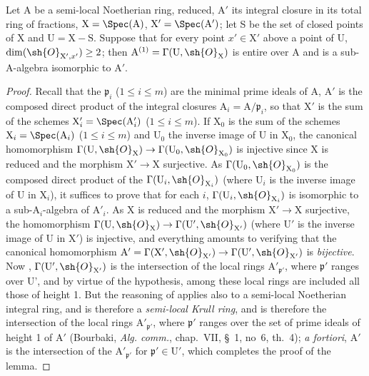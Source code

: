 \begin{lemma}[18.9.7.5]
\label{IV.18.9.7.5}
Let $\mathrm{A}$ be a semi-local Noetherian ring, reduced, $\mathrm{A}'$ its integral closure in its total ring of fractions, $\mathrm{X}=\Spec(\mathrm{A})$, $\mathrm{X}'=\Spec(\mathrm{A}')$;
let S be the set of closed points of $\mathrm{X}$ and $\mathrm{U}=\mathrm{X}-\mathrm{S}$.
Suppose that for every point $x'\in\mathrm{X}'$ above a point of $\mathrm{U}$, $\dim(\sh{O}_{\mathrm{X}',x'})\geq 2$;
then $\mathrm{A}^{(1)}=\Gamma(\mathrm{U},\sh{O}_{\mathrm{X}})$ is entire over $\mathrm{A}$ and is a sub-A-algebra isomorphic to $\mathrm{A}'$.
\end{lemma}

\begin{proof}
Recall that the $\mathfrak{p}_i$ ($1\leq i\leq m$) are the minimal prime ideals of A, $\mathrm{A}'$ is the composed direct product of the integral closures $\mathrm{A}_i=\mathrm{A}/\mathfrak{p}_i$, so that $\mathrm{X}'$ is the sum of the schemes $\mathrm{X}'_i=\Spec(\mathrm{A}'_i)$ ($1\leq i\leq m$).
If $\mathrm{X}_0$ is the sum of the schemes $\mathrm{X}_i=\Spec(\mathrm{A}_i)$ ($1\leq i\leq m$) and $\mathrm{U}_0$ the inverse image of U in $\mathrm{X}_0$, the canonical homomorphism $\Gamma(\mathrm{U},\sh{O}_{\mathrm{X}})\to\Gamma(\mathrm{U}_0,\sh{O}_{\mathrm{X}_0})$ is injective since X is reduced and the morphism $\mathrm{X}'\to\mathrm{X}$ surjective.
As $\Gamma(\mathrm{U}_0,\sh{O}_{\mathrm{X}_0})$ is the composed direct product of the $\Gamma(\mathrm{U}_i,\sh{O}_{\mathrm{X}_i})$ (where $\mathrm{U}_i$ is the inverse image of U in $\mathrm{X}_i$), it suffices to prove that for each $i$, $\Gamma(\mathrm{U}_i,\sh{O}_{\mathrm{X}_i})$ is isomorphic to a sub-$\mathrm{A}_i$-algebra of $\mathrm{A}'_i$.
As X is reduced and the morphism $\mathrm{X}'\to\mathrm{X}$ surjective, the homomorphism $\Gamma(\mathrm{U},\sh{O}_{\mathrm{X}})\to\Gamma(\mathrm{U}',\sh{O}_{\mathrm{X}'})$ (where $\mathrm{U}'$ is the inverse image of U in $\mathrm{X}'$) is injective, and everything amounts to verifying that the canonical homomorphism $\mathrm{A}'=\Gamma(\mathrm{X}',\sh{O}_{\mathrm{X}'})\to\Gamma(\mathrm{U}',\sh{O}_{\mathrm{X}'})$ is \emph{bijective}.
Now , $\Gamma(\mathrm{U}',\sh{O}_{\mathrm{X}'})$ is the intersection of the local rings $\mathrm{A}'_{\mathfrak{p}'}$, where $\mathfrak{p}'$ ranges over U', and by virtue of the hypothesis, among these local rings are included all those of height 1.
But the reasoning of  applies also to a semi-local Noetherian integral ring, and is therefore a \emph{semi-local Krull ring}, and is therefore the intersection of the local rings $\mathrm{A}'_{\mathfrak{p}'}$, where $\mathfrak{p}'$ ranges over the set of prime ideals of height 1 of $\mathrm{A}'$ (Bourbaki, \emph{Alg. comm.}, chap.~VII, \S~1, no~6, th.~4);
\emph{a fortiori}, $\mathrm{A}'$ is the intersection of the $\mathrm{A}'_{\mathfrak{p}'}$ for $\mathfrak{p}'\in\mathrm{U}'$, which completes the proof of the lemma.
\end{proof}


